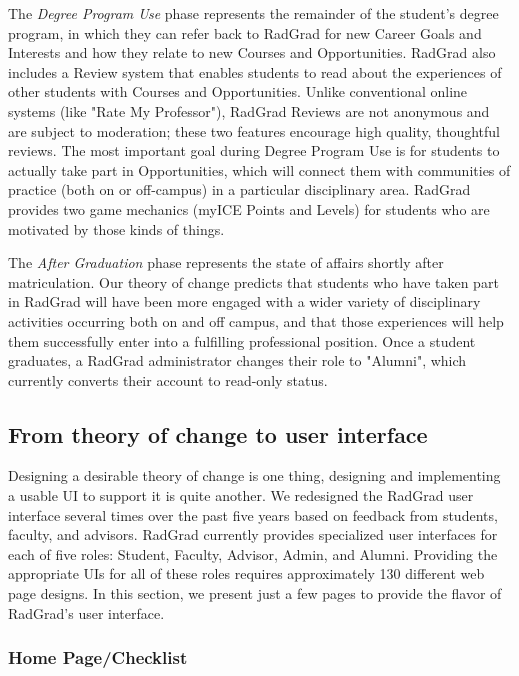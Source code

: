 \documentclass[acmsmall,nonacm]{acmart}
\begin{document}
The {\em Degree Program Use} phase represents the remainder of the student's degree program, in which they can refer back to RadGrad for new Career Goals and Interests and how they relate to new Courses and Opportunities. RadGrad also includes a Review system that enables students to read about the experiences of other students with Courses and Opportunities. Unlike conventional online systems (like "Rate My Professor"), RadGrad Reviews are not anonymous and are subject to moderation; these two features encourage high quality, thoughtful reviews.  The most important goal during Degree Program Use is for students to actually take part in Opportunities, which will connect them with communities of practice (both on or off-campus) in a particular disciplinary area. RadGrad provides two game mechanics (myICE Points and Levels) for students who are motivated by those kinds of things.

The {\em After Graduation} phase represents the state of affairs shortly after matriculation.  Our theory of change predicts that students who have taken part in RadGrad will have been more engaged with a wider variety of disciplinary activities occurring both on and off campus, and that those experiences will help them successfully enter into a fulfilling professional position. Once a student graduates, a RadGrad administrator changes their role to "Alumni", which currently converts their account to read-only status.

\subsection{From theory of change to user interface}

Designing a desirable theory of change is one thing, designing and implementing a usable UI to support it is quite another. We redesigned the RadGrad user interface several times over the past five years based on feedback from students, faculty, and advisors.  RadGrad currently provides specialized user interfaces for each of five roles: Student, Faculty, Advisor, Admin, and Alumni. Providing the appropriate UIs for all of these roles requires approximately 130 different web page designs. In this section, we present just a few pages to provide the flavor of RadGrad's user interface.

\subsubsection{Home Page/Checklist}
\end{document}
